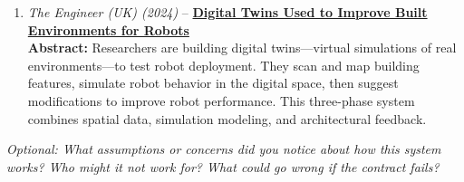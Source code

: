 \documentclass[12pt]{article}
\begin{document}
\begin{enumerate}[label=\arabic*.]
 \item \textit{The Engineer (UK) (2024)} -- \href{https://technews.acm.org/archives.cfm?fo=2024-06-jun#48}{\textbf{Digital Twins Used to Improve Built Environments for Robots}}\\
\footnotesize\textbf{Abstract:} Researchers are building digital twins—virtual simulations of real environments—to test robot deployment. They scan and map building features, simulate robot behavior in the digital space, then suggest modifications to improve robot performance. This three-phase system combines spatial data, simulation modeling, and architectural feedback.\\

\end{enumerate}

\vfill
\noindent \textit{Optional: What assumptions or concerns did you notice about how this system works? Who might it not work for? What could go wrong if the contract fails?}
\end{document}
